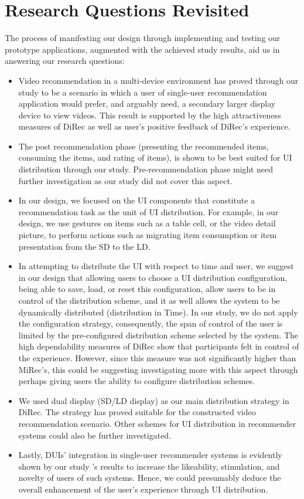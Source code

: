 \section{Research Questions Revisited} 
The process of manifesting our design through implementing and testing our
prototype applications, augmented with the achieved study results, aid us in
answering our research questions:
\begin{itemize}
  \item Video recommendation in a multi-device environment has proved through 
  our study to be a scenario in which a user of single-user recommendation
  application would prefer, and arguably need, a secondary larger display device
  to view videos. This result is supported by the high attractiveness measures
  of DiRec as well as user's positive feedback of DiRec's experience.
  \item The post recommendation phase (presenting the recommended items,
  consuming the items, and rating of items), is shown to be best suited for UI
  distribution through our study. Pre-recommendation phase might need further
  investigation as our study did not cover this aspect.
  \item In our design, we focused on the UI components that constitute a
  recommendation task as the unit of UI distribution. For example, in our
  design, we use gestures on items such as a table cell, or the video detail
  picture, to perform actions such as migrating item consumption or item
  presentation from the SD to the LD.
  \item In attempting to distribute the UI with respect to time and user, we
  suggest in our design that allowing users to choose a UI distribution
  configuration, being able to save, load, or reset this configuration, allow
  users to be in control of the distribution scheme, and it as well allows the
  system to be dynamically distributed (distribution in Time). In our study, we
  do not apply the configuration strategy, consequently, the span of control of
  the user is limited by the pre-configured distribution scheme selected by the
  system. The high dependability measures of DiRec show that participants felt
  in control of the experience. However, since this measure was not
  significantly higher than MiRec's, this could be suggesting investigating more
  with this aspect through perhaps giving users the ability to configure
  distribution schemes.
  \item We used dual display (SD/LD display) as our main distribution strategy
  in DiRec. The strategy has proved suitable for the constructed video
  recommendation scenario. Other schemes for UI distribution in recommender
  systems could also be further investigated.
  \item Lastly, DUIs' integration in single-user recommender systems is
  evidently shown by our study 's results to increase the likeability,
  stimulation, and novelty of users of such systems. Hence, we could presumably
  deduce the overall enhancement of the user's experience through UI
  distribution.
\end{itemize}

